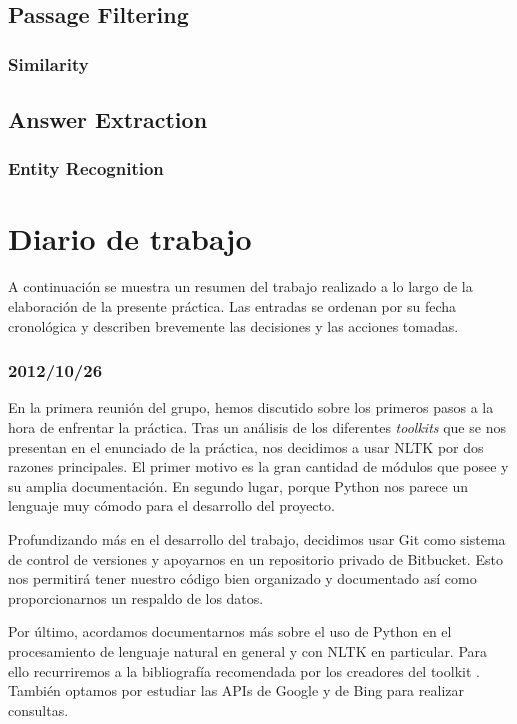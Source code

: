 \documentclass[12pt,a4paper,titlepage]{article}
\begin{document}
\subsection{Passage Filtering}
\subsubsection{Similarity}

\subsection{Answer Extraction}
\subsubsection{Entity Recognition}
\label{s:ne_recog}

\clearpage
\section{Diario de trabajo}
A continuación se muestra un resumen del trabajo realizado a lo largo de la elaboración de la presente práctica. Las entradas se ordenan por su fecha cronológica y describen brevemente las decisiones y las acciones tomadas.


\subsubsection*{2012/10/26}
En la primera reunión del grupo, hemos discutido sobre los primeros pasos a la hora de enfrentar la práctica. Tras un análisis de los diferentes \emph{toolkits} que se nos presentan en el enunciado de la práctica, nos decidimos a usar NLTK por dos razones principales. El primer motivo es la gran cantidad de módulos que posee y su amplia documentación. En segundo lugar, porque Python nos parece un lenguaje muy cómodo para el desarrollo del proyecto.

Profundizando más en el desarrollo del trabajo, decidimos usar Git como sistema de control de versiones y apoyarnos en un repositorio privado de Bitbucket. Esto nos permitirá tener nuestro código bien organizado y documentado así como proporcionarnos un respaldo de los datos.

Por último, acordamos documentarnos más sobre el uso de Python en el procesamiento de lenguaje natural en general y con NLTK en particular. Para ello recurriremos a la bibliografía recomendada por los creadores del toolkit \cite{nltk-book}. También optamos por estudiar las APIs de Google y de Bing para realizar consultas.
\end{document}

